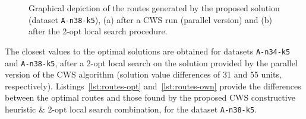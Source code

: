 \begin{figure}[h!]
    \centering



    \cprotect\caption{Graphical depiction of the routes generated 
            by the proposed solution (dataset \verb?A-n38-k5?), (a) after a CWS run 
            (parallel version) and (b) after the 2-opt local search procedure.}
    \label{fig:A-n38-k5-p-graph}

\end{figure}

The closest values to the optimal solutions are obtained for datasets \verb?A-n34-k5? and 
\verb?A-n38-k5?, after 
a 2-opt local search on the solution provided by the parallel version of the 
CWS algorithm (solution value differences of 31 and 55 units, respectively). 
Listings~\ref{lst:routes-opt} and~\ref{lst:routes-own} provide the differences 
between the optimal routes and those found by the proposed CWS constructive 
heuristic \& 2-opt local search combination, for the dataset \verb?A-n38-k5?.\vertbreak

